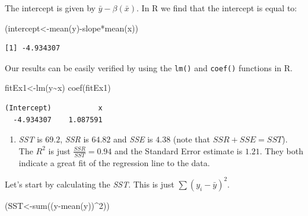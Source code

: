 \documentclass[
  letterpaper,
  DIV=11,
  numbers=noendperiod]{scrreprt}
\newenvironment{Shaded}{\begin{snugshade}}{\end{snugshade}}
\newcommand{\DecValTok}[1]{\textcolor[rgb]{0.68,0.00,0.00}{#1}}
\newcommand{\FunctionTok}[1]{\textcolor[rgb]{0.28,0.35,0.67}{#1}}
\newcommand{\NormalTok}[1]{\textcolor[rgb]{0.00,0.23,0.31}{#1}}
\newcommand{\OtherTok}[1]{\textcolor[rgb]{0.00,0.23,0.31}{#1}}
\newcommand{\SpecialCharTok}[1]{\textcolor[rgb]{0.37,0.37,0.37}{#1}}
\providecommand{\tightlist}{%
  \setlength{\itemsep}{0pt}\setlength{\parskip}{0pt}}\usepackage{longtable,booktabs,array}
\begin{document}
The intercept is given by \(\bar{y}-\beta(\bar{x})\). In R we find that
the intercept is equal to:

\begin{Shaded}
\begin{Highlighting}[numbers=left,,]
\NormalTok{(intercept}\OtherTok{\textless{}{-}}\FunctionTok{mean}\NormalTok{(y)}\SpecialCharTok{{-}}\NormalTok{slope}\SpecialCharTok{*}\FunctionTok{mean}\NormalTok{(x))}
\end{Highlighting}
\end{Shaded}

\begin{verbatim}
[1] -4.934307
\end{verbatim}

Our results can be easily verified by using the \texttt{lm()} and
\texttt{coef()} functions in R.

\begin{Shaded}
\begin{Highlighting}[numbers=left,,]
\NormalTok{fitEx1}\OtherTok{\textless{}{-}}\FunctionTok{lm}\NormalTok{(y}\SpecialCharTok{\textasciitilde{}}\NormalTok{x)}
\FunctionTok{coef}\NormalTok{(fitEx1)}
\end{Highlighting}
\end{Shaded}

\begin{verbatim}
(Intercept)           x 
  -4.934307    1.087591 
\end{verbatim}

\begin{enumerate}
\def\labelenumi{\arabic{enumi}.}
\setcounter{enumi}{1}
\tightlist
\item
  \emph{SST} is \(69.2\), \emph{SSR} is \(64.82\) and \emph{SSE} is
  \(4.38\) (note that \(SSR+SSE=SST\)). The \(R^2\) is just
  \(\frac{SSR}{SST}=0.94\) and the Standard Error estimate is \(1.21\).
  They both indicate a great fit of the regression line to the data.
\end{enumerate}

Let's start by calculating the \emph{SST}. This is just
\(\sum{(y_{i}-\bar{y})^2}\).

\begin{Shaded}
\begin{Highlighting}[numbers=left,,]
\NormalTok{(SST}\OtherTok{\textless{}{-}}\FunctionTok{sum}\NormalTok{((y}\SpecialCharTok{{-}}\FunctionTok{mean}\NormalTok{(y))}\SpecialCharTok{\^{}}\DecValTok{2}\NormalTok{))}
\end{Highlighting}
\end{Shaded}
\end{document}
